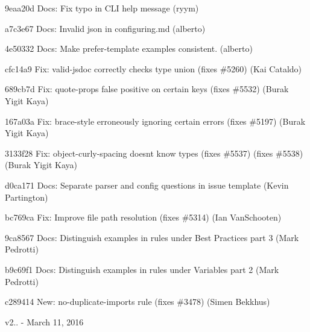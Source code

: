 \begin{DoxyItemize}
\item 9eaa20d Docs\+: Fix typo in C\+LI help message (ryym)
\item a7c3e67 Docs\+: Invalid json in {\ttfamily configuring.\+md} (alberto)
\item 4e50332 Docs\+: Make {\ttfamily prefer-\/template} examples consistent. (alberto)
\item cfc14a9 Fix\+: valid-\/jsdoc correctly checks type union (fixes \#5260) (Kai Cataldo)
\item 689cb7d Fix\+: {\ttfamily quote-\/props} false positive on certain keys (fixes \#5532) (Burak Yigit Kaya)
\item 167a03a Fix\+: {\ttfamily brace-\/style} erroneously ignoring certain errors (fixes \#5197) (Burak Yigit Kaya)
\item 3133f28 Fix\+: object-\/curly-\/spacing doesn\textquotesingle{}t know types (fixes \#5537) (fixes \#5538) (Burak Yigit Kaya)
\item d0ca171 Docs\+: Separate parser and config questions in issue template (Kevin Partington)
\item bc769ca Fix\+: Improve file path resolution (fixes \#5314) (Ian Van\+Schooten)
\item 9ca8567 Docs\+: Distinguish examples in rules under Best Practices part 3 (Mark Pedrotti)
\item b9c69f1 Docs\+: Distinguish examples in rules under Variables part 2 (Mark Pedrotti)
\item c289414 New\+: {\ttfamily no-\/duplicate-\/imports} rule (fixes \#3478) (Simen Bekkhus)
\end{DoxyItemize}

v2.. -\/ March 11, 2016


